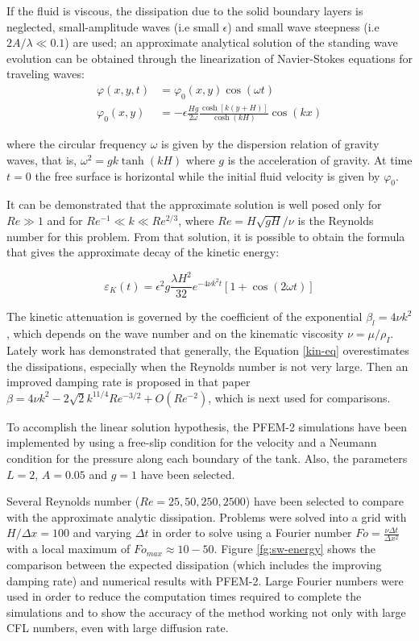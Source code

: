 If the fluid is viscous, the dissipation due to the solid boundary layers is neglected, small-amplitude waves (i.e small $\epsilon$) and small wave steepness (i.e $2A/\lambda \ll 0.1$) are used; an approximate analytical solution of the standing wave evolution can be obtained through the linearization of Navier-Stokes equations for traveling waves:
\begin{align}
 \varphi(x,y,t) & = \varphi_0(x,y)\cos(\omega t) \\
 \varphi_0(x,y) & =-\epsilon\frac{Hg}{2\omega}\frac{\cosh\left[k(y+H)\right]}{\cosh(kH)}\cos(kx)
\end{align}

where the circular frequency $\omega$ is given by the dispersion relation of gravity waves, that is, $\omega^2 = g k \tanh(kH)$ where $g$ is the acceleration of gravity. At time $t = 0$ the free surface is horizontal while the initial fluid velocity is given by $\varphi_0$.

It can be demonstrated that the approximate solution is well posed only for $Re\gg1$ and for $Re^{-1}\ll k \ll Re^{2/3}$, where $Re=H\sqrt{gH}/\nu$ is the Reynolds number for this problem. From that solution, it is possible to obtain the formula that gives the approximate decay of the kinetic energy\cite{Lighthill01}:

\begin{equation}
 \varepsilon_K(t) = \epsilon^2g\frac{\lambda H^2}{32}e^{-4\nu k^2t}\left[1+\cos(2\omega t)\right]
 \label{kin-eq}
\end{equation}

The kinetic attenuation is governed by the coefficient of the exponential $\beta_l = 4\nu k^2$, which depends on the wave number and on the kinematic viscosity $\nu = \mu/\rho_{I}$. Lately work\cite{Antuono13} has demonstrated that generally, the Equation \ref{kin-eq} overestimates the dissipations, especially when the Reynolds number is not very large. Then an improved damping rate is proposed in that paper $\beta = 4\nu k^2 -  2\sqrt{2}k^{11/4}Re^{-3/2}+O(Re^{-2})$, which is next used for comparisons.

To accomplish the linear solution hypothesis, the PFEM-2 simulations have been implemented by using a free-slip condition for the velocity and a Neumann condition for the pressure along each boundary of the tank. Also, the parameters $L=2$, $A=0.05$ and $g=1$ have been selected.

Several Reynolds number ($Re=25,50,250,2500$) have been selected to compare with the approximate analytic dissipation. Problems were solved into a grid with $H/\Delta x=100$ and varying $\Delta t$ in order to solve using a Fourier number $Fo=\frac{\nu\Delta t}{\Delta x^2}$ with a local maximum of $Fo_{max}\approx10-50$. Figure \ref{fg:sw-energy} shows the comparison between the expected dissipation (which includes the improving damping rate) and numerical results with PFEM-2. Large Fourier numbers were used in order to reduce the computation times required to complete the simulations and to show the accuracy of the method working not only with large CFL numbers, even with large diffusion rate.

